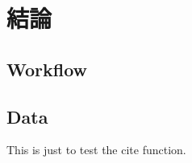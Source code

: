 
\chapter{結論}

\section{Workflow}

\lipsum

\section{Data}

\lipsum

This is just to test \cite{Krasnogor2004e} the cite function.